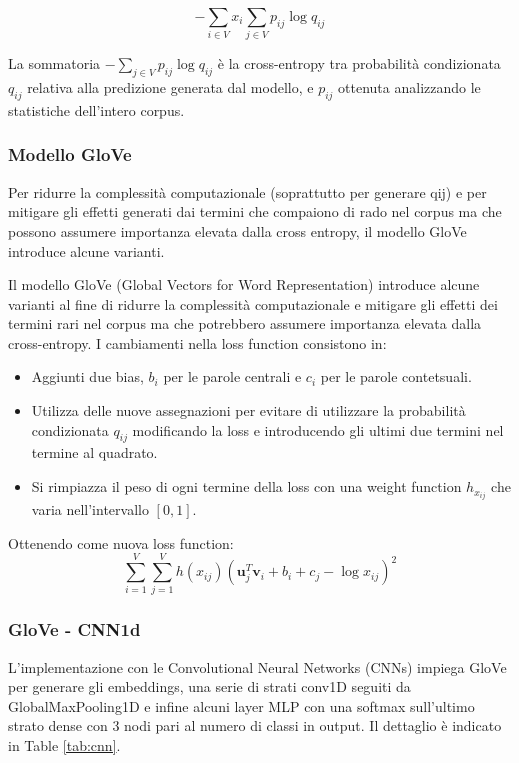 \[-\sum_{i \in V} x_{i} \sum_{j \in V} p_{ij} \log q_{ij}\]

La sommatoria $-\sum_{j \in V} p_{ij} \log q_{ij}$ è la cross-entropy tra probabilità condizionata $q_{ij}$ relativa alla predizione generata dal modello, e $p_{ij}$ ottenuta analizzando le
statistiche dell'intero corpus.

\subsubsection{Modello GloVe}
Per ridurre la complessità computazionale (soprattutto per generare qij) e per mitigare gli effetti generati dai termini che compaiono di rado nel corpus ma che possono assumere importanza elevata dalla cross entropy, il modello GloVe introduce alcune varianti.


Il modello GloVe (Global Vectors for Word Representation) introduce alcune varianti al fine di ridurre la complessità computazionale e mitigare gli effetti dei termini rari nel corpus ma che potrebbero assumere importanza elevata dalla cross-entropy. I cambiamenti nella loss function consistono in:
\begin{itemize}
    \item Aggiunti due bias, $b_{i}$ per le parole centrali e $c_{i}$ per le parole contetsuali.  
    \item Utilizza delle nuove assegnazioni per evitare di utilizzare la probabilità condizionata $q_{ij}$ modificando la loss e introducendo gli ultimi due termini nel termine al quadrato.
    \item Si rimpiazza il peso di ogni termine della loss con una weight function $h_{x_{ij}}$ che varia nell'intervallo $[0,1]$.
\end{itemize}

Ottenendo come nuova loss function:
\[\sum_{i=1}^{V}\sum_{j=1}^{V} h(x_{ij}) \left( \mathbf{u}_j^T \mathbf{v}_i + b_i + c_j - \log x_{ij} \right)^2\]

\newpage

  \subsubsection{GloVe - CNN1d}
  L'implementazione con le Convolutional Neural Networks (CNNs) impiega GloVe per generare gli embeddings, una serie di strati conv1D seguiti da GlobalMaxPooling1D e infine alcuni layer MLP con una softmax sull'ultimo strato dense con 3 nodi pari al numero di classi in output. Il dettaglio è indicato in Table \ref{tab:cnn}.

